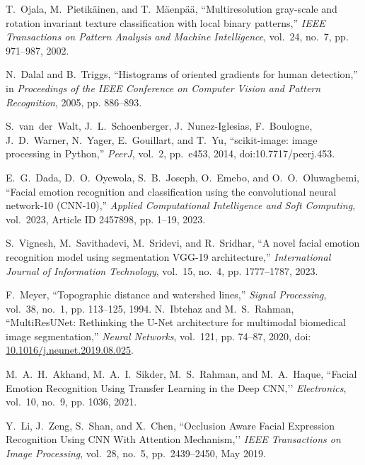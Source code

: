 \documentclass[lettersize,journal]{IEEEtran}
\begin{document}
\begin{thebibliography}{1}



T.~Ojala, M.~Pietik\"ainen, and T.~M\"aenp\"a\"a, ``Multiresolution gray-scale and rotation invariant texture classification with local binary patterns,'' \emph{IEEE Transactions on Pattern Analysis and Machine Intelligence}, vol.~24, no.~7, pp. 971--987, 2002.

N.~Dalal and B.~Triggs, ``Histograms of oriented gradients for human detection,'' in \emph{Proceedings of the IEEE Conference on Computer Vision and Pattern Recognition}, 2005, pp. 886--893.

S.~van~der~Walt, J.~L.~Schoenberger, J.~Nunez-Iglesias, F.~Boulogne, J.~D.~Warner, N.~Yager, E.~Gouillart, and T.~Yu, ``scikit-image: image processing in Python,'' \emph{PeerJ}, vol.~2, pp.~e453, 2014, doi:10.7717/peerj.453.




E.~G.~Dada, D.~O.~Oyewola, S.~B.~Joseph, O.~Emebo, and O.~O.~Oluwagbemi, 
``Facial emotion recognition and classification using the convolutional neural network‐10 (CNN‐10),'' 
\emph{Applied Computational Intelligence and Soft Computing}, vol.~2023, Article ID 2457898, pp. 1--19, 2023.

S.~Vignesh, M.~Savithadevi, M.~Sridevi, and R.~Sridhar, 
``A novel facial emotion recognition model using segmentation VGG-19 architecture,'' 
\emph{International Journal of Information Technology}, vol.~15, no.~4, pp. 1777--1787, 2023.

F.~Meyer, ``Topographic distance and watershed lines,'' \emph{Signal Processing}, vol.~38, no.~1, pp. 113--125, 1994.
N.~Ibtehaz and M.~S.~Rahman, ``MultiResUNet: Rethinking the U-Net architecture for multimodal biomedical image segmentation,'' \emph{Neural Networks}, vol.~121, pp. 74--87, 2020, doi: \href{https://doi.org/10.1016/j.neunet.2019.08.025}{10.1016/j.neunet.2019.08.025}.

M.~A.~H.~Akhand, M.~A.~I.~Sikder, M.~S.~Rahman, and M.~A.~Haque,
``Facial Emotion Recognition Using Transfer Learning in the Deep CNN,’’
\emph{Electronics}, vol.~10, no.~9, pp. 1036, 2021.

Y.~Li, J.~Zeng, S.~Shan, and X.~Chen,
``Occlusion Aware Facial Expression Recognition Using CNN With Attention Mechanism,’’
\emph{IEEE Transactions on Image Processing}, vol.~28, no.~5, pp.~2439–2450, May 2019.


\end{thebibliography}
\end{document}

